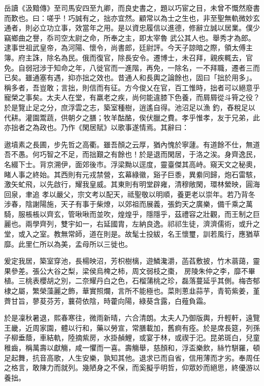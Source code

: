 \begin{pinyinscope}
 岳讀《汲黯傳》至司馬安四至九卿，而良史書之，題以巧宦之目，未曾不慨然廢書而歎也。曰：嗟乎！巧誠有之，拙亦宜然。顧常以為士之生也，非至聖無軌微妙玄通者，則必立功立事，效當年之用。是以資忠履信以進德，修辭立誠以居業。僕少竊鄉曲之譽，忝司空太尉之命，所奉之主，即太宰魯
 武公其人也。舉秀才為郎。逮事世祖武皇帝，為河陽、懷令，尚書郎，廷尉評。今天子諒暗之際，領太傅主簿。府主誅，除名為民。俄而復官，除長安令。遷博士，未召拜，親疾輒去，官免。自弱冠涉于知命之年，八徙官而一進階，再免，一除名，一不拜職，遷者三而已矣。雖通塞有遇，抑亦拙之效也。昔通人和長輿之論餘也，固曰「拙於用多」。稱多者，吾豈敢；言拙，則信而有征。方今俊乂在官，百工惟時，拙者可以絕意乎寵榮之事矣。太夫人在堂，有羸老之疾，尚何能違膝下色養，而屑屑從斗筲之役？於是覽止足之分，庶浮雲之志，築室種樹，逍遙自得。池沼足以漁
 釣，舂稅足以代耕。灌園鬻蔬，供朝夕之膳；牧羊酤酪，俟伏臘之費。孝乎惟孝，友于兄弟，此亦拙者之為政也。乃作《閑居賦》以歌事遂情焉。其辭曰：



 遨墳素之長圃，步先哲之高衢。雖吾顏之云厚，猶內愧於寧蘧。有道餘不仕，無道吾不愚。何巧智之不足，而拙艱之有餘也！於是退而閑居，于洛之涘。身齊逸民，名綴下士。背京溯伊，面郊後市。浮梁黝以逕度，靈臺傑其高峙。窺天文之秘奧，睹人事之終始。其西則有元戎禁營，玄幕綠徽，谿子巨黍，異絭同歸，炮石雷駭，激矢虻飛，以先啟行，耀我皇威。其東則有明堂辟雍，清穆敞閑，環林縈映，圓海回泉，聿追
 孝以嚴父，宗文考以配天，祗聖敬以明順，養更老以崇年。若乃背冬涉春，陰謝陽施，天子有事于柴燎，以郊祖而展義，張鈞天之廣樂，備千乘之萬騎，服棖棖以齊玄，管啾啾而並吹，煌煌乎，隱隱乎，茲禮容之壯觀，而王制之巨麗也。兩學齊列，雙宇如一，右延國胄，左納良逸。祁祁生徒，濟濟儒術，或升之堂，或入之室。教無常師，道在則是。故髦士投紱，名王懷璽，訓若風行，應猶草靡。此里仁所以為美，孟母所以三徙也。



 爰定我居，築室穿池，長楊映沼，芳枳樹樆，遊鱗瀺灂，菡萏敷披，竹木蓊藹，靈果參差。張公大谷之梨，梁侯烏椑之柿，周文弱枝之棗，
 房陵朱仲之李，靡不畢植。三桃表櫻胡之別，二奈耀丹白之色，石榴蒲桃之珍，磊落蔓延乎其側。梅杏郁棣之屬，繁榮藻麗之飾，華實照爛，言所不能極也。菜則蔥韭蒜芋，青筍紫姜，堇薺甘旨，蓼荾芬芳，蘘荷依陰，時藿向陽，綠葵含露，白薤負霜。



 於是凜秋暑退，熙春寒往，微雨新晴，六合清朗。太夫人乃御版輿，升輕軒，遠覽王畿，近周家園，體以行和，藥以勞宣，常膳載加，舊痾有痊。於是席長筵，列孫子柳垂蔭，車結軌，陸摘紫房，水掛赬鯉，或宴于林，或禊于汜。昆弟斑白，兒童稚齒，稱萬壽以獻觴，咸一懼而一喜。壽觴舉，慈顏和，浮盃樂飲，絲竹駢羅，頓
 足起舞，抗音高歌，人生安樂，孰知其他。退求已而自省，信用薄而才劣。奉周任之格言，敢陳力而就列。幾陋身之不保，而奚擬乎明哲，仰眾妙而絕思，終優游以養拙。




\end{pinyinscope}
